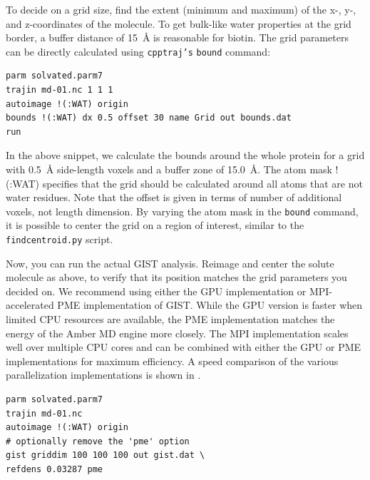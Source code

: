 \documentclass[9pt,tutorial]{livecoms}
\newcommand{\software}{\texttt}
\newcommand\inlinecode{\texttt}
\begin{document}
To decide on a grid size, find the extent (minimum and maximum) of the x-, \mbox{y-,} and z-coordinates of the molecule.
To get bulk-like water properties at the grid border, a buffer distance of \SI{15}{\angstrom} is reasonable for biotin.
The grid parameters can be directly calculated using \software{cpptraj's} \inlinecode{bound} command:
\begin{lstlisting}[style=cpptraj]
parm solvated.parm7
trajin md-01.nc 1 1 1
autoimage !(:WAT) origin
bounds !(:WAT) dx 0.5 offset 30 name Grid out bounds.dat
run
\end{lstlisting}
In the above snippet, we calculate the bounds around the whole protein for a grid with \SI{0.5}{\angstrom} side-length voxels and a buffer zone of \SI{15.0}{\angstrom}. 
The atom mask !(:WAT) specifies that the grid should be calculated around all atoms that are not water residues.
Note that the offset is given in terms of number of additional voxels, not length dimension. 
By varying the atom mask in the \inlinecode{bound} command, it is possible to center the grid on a region of interest, similar to the \software{findcentroid.py} script.

Now, you can run the actual GIST analysis.
Reimage and center the solute molecule as above, to verify that its position matches the grid parameters you decided on.
We recommend using either the GPU implementation or MPI-accelerated PME implementation of GIST.
While the GPU version is faster when limited CPU resources are available, the PME implementation matches the energy of the Amber MD engine more closely.
The MPI implementation \cite{Roe2023-mpi-gist} scales well over multiple CPU cores and can be combined with either the GPU or PME implementations for maximum efficiency. 
A speed comparison of the various parallelization implementations is shown in \cite{Roe2023-mpi-gist}.

\begin{lstlisting}[style=cpptraj]
parm solvated.parm7
trajin md-01.nc
autoimage !(:WAT) origin
# optionally remove the 'pme' option
gist griddim 100 100 100 out gist.dat \
refdens 0.03287 pme
\end{lstlisting}
\end{document}
